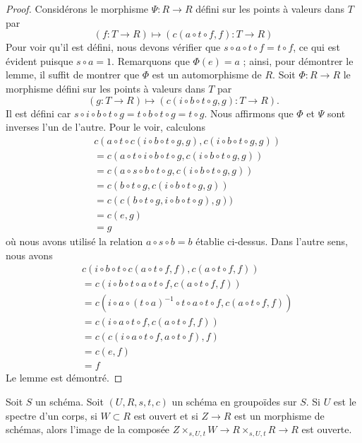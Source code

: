 \begin{proof}
\medskip\noindent
Considérons le morphisme $\Psi : R \to R$ défini sur les points à valeurs dans $T$
par
$$
(f : T \to R) \longmapsto (c(a \circ t \circ f, f) : T \to R)
$$
Pour voir qu'il est défini, nous devons vérifier que
$s \circ a \circ t \circ f = t \circ f$, ce qui est évident puisque $s \circ a = 1$.
Remarquons que $\Phi(e) = a$ ; ainsi, pour démontrer le lemme, il
suffit de montrer que $\Phi$ est un automorphisme de $R$.
Soit $\Phi : R \to R$ le morphisme défini sur les points à valeurs dans $T$ par
$$
(g : T \to R) \longmapsto (c(i \circ b \circ t \circ g, g) : T \to R).
$$
Il est défini car
$s \circ i \circ b \circ t \circ g = t \circ b \circ t \circ g =
t \circ g$. Nous affirmons que $\Phi$ et $\Psi$ sont inverses
l'un de l'autre. Pour le voir, calculons
\begin{align*}
& c(a \circ t \circ c(i \circ b \circ t \circ g, g),
c(i \circ b \circ t \circ g, g)) \\
& =
c(a \circ t \circ i \circ b \circ t \circ g,
c(i \circ b \circ t \circ g, g)) \\
& =
c(a \circ s \circ b \circ t \circ g,
c(i \circ b \circ t \circ g, g)) \\
& =
c(b \circ t \circ g, c(i \circ b \circ t \circ g, g)) \\
& =
c(c(b \circ t \circ g, i \circ b \circ t \circ g), g)) \\
& =
c(e, g) \\
& = g
\end{align*}
où nous avons utilisé la relation $a \circ s \circ b = b$ établie ci-dessus.
Dans l'autre sens, nous avons
\begin{align*}
& c(i \circ b \circ t \circ c(a \circ t \circ f, f), c(a \circ t \circ f, f)) \\
& =
c(i \circ b \circ t \circ a \circ t \circ f, c(a \circ t \circ f, f)) \\
& =
c(i \circ a \circ (t \circ a)^{-1} \circ t \circ a \circ t \circ f,
c(a \circ t \circ f, f)) \\
& =
c(i \circ a \circ t \circ f, c(a \circ t \circ f, f)) \\
& =
c(c(i \circ a \circ t \circ f, a \circ t \circ f), f) \\
& =
c(e, f) \\
& = f
\end{align*}
Le lemme est démontré.
\end{proof}

\begin{lemma}
\label{lemma-groupoid-on-field-translate-open}
Soit $S$ un schéma. Soit $(U, R, s, t, c)$ un schéma en groupoïdes
sur $S$. Si $U$ est le spectre d'un corps, si $W \subset R$ est ouvert
et si $Z \to R$ est un morphisme de schémas, alors l'image de la
composée $Z \times_{s, U, t} W \to R \times_{s, U, t} R \to R$ est ouverte.
\end{lemma}

